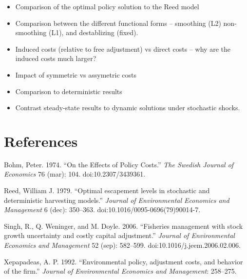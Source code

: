 \documentclass[review, 12pt]{elsarticle}
\begin{document}
\begin{itemize}
\item   Comparison of the optimal policy solution to the Reed model
\item  Comparison between the different functional forms -- smoothing (L2)
  non-smoothing (L1), and destablizing (fixed).
\item   Induced costs (relative to free adjustment) vs direct costs -- why are
  the induced costs much larger?
\item   Impact of symmetric vs assymetric costs
\item   Comparison to deterministic results
\item   Contrast steady-state results to dynamic solutions under stochastic
  shocks.
\end{itemize}


\section{References}

Bohm, Peter. 1974. ``On the Effects of Policy Costs.'' \emph{The Swedish
Journal of Economics} 76 (mar): 104. doi:10.2307/3439361.

Reed, William J. 1979. ``Optimal escapement levels in stochastic and
deterministic harvesting models.'' \emph{Journal of Environmental
Economics and Management} 6 (dec): 350--363.
doi:10.1016/0095-0696(79)90014-7.

Singh, R., Q. Weninger, and M. Doyle. 2006. ``Fisheries management with
stock growth uncertainty and costly capital adjustment.'' \emph{Journal
of Environmental Economics and Management} 52 (sep): 582--599.
doi:10.1016/j.jeem.2006.02.006.

Xepapadeas, A. P. 1992. ``Environmental policy, adjustment costs, and
behavior of the firm.'' \emph{Journal of Environmental Economics and
Management}: 258--275.
\end{document}
